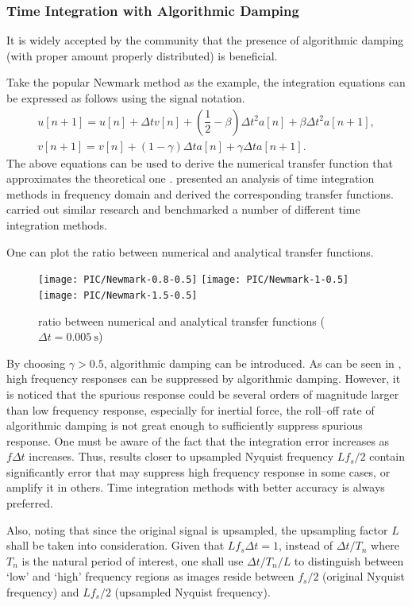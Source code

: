 \subsubsection{Time Integration with Algorithmic Damping}
It is widely accepted by the community that the presence of algorithmic damping (with proper amount properly distributed) is beneficial.

Take the popular Newmark method as the example, the integration equations can be expressed as follows using the signal notation.
\begin{gather}
u[n+1]=u[n]+\Delta{}tv[n]+\left(\dfrac{1}{2}-\beta\right)\Delta{}t^2a[n]+\beta\Delta{}t^2a[n+1],\\
v[n+1]=v[n]+\left(1-\gamma\right)\Delta{}ta[n]+\gamma\Delta{}ta[n+1].
\end{gather}
The above equations can be used to derive the numerical transfer function that approximates the theoretical one . \citet{Preumont1982} presented an analysis of time integration methods in frequency domain and derived the corresponding transfer functions. \citet{AriasTrujillo2012} carried out similar research and benchmarked a number of different time integration methods.

One can plot the ratio between numerical and analytical transfer functions.
\begin{figure}[htb!]
\centering
\texttt{[image: PIC/Newmark-0.8-0.5]}
\texttt{[image: PIC/Newmark-1-0.5]}
\texttt{[image: PIC/Newmark-1.5-0.5]}
\caption{ratio between numerical and analytical transfer functions ($\Delta{}t=\SI{0.005}{\second}$)}\label{fig:newmark_alg_damping}
\end{figure}
By choosing $\gamma>\num{0.5}$, algorithmic damping can be introduced. As can be seen in , high frequency responses can be suppressed by algorithmic damping. However, it is noticed that the spurious response could be several orders of magnitude larger than low frequency response, especially for inertial force, the roll--off rate of algorithmic damping is not great enough to sufficiently suppress spurious response. One must be aware of the fact that the integration error increases as $f\Delta{}t$ increases. Thus, results closer to upsampled Nyquist frequency $Lf_s/2$ contain significantly error that may suppress high frequency response in some cases, or amplify it in others. Time integration methods with better accuracy is always preferred.

Also, noting that since the original signal is upsampled, the upsampling factor $L$ shall be taken into consideration. Given that $Lf_s\Delta{}t=1$, instead of $\Delta{}t/T_n$ where $T_n$ is the natural period of interest, one shall use $\Delta{}t/T_n/L$ to distinguish between `low' and `high' frequency regions as images reside between $f_s/2$ (original Nyquist frequency) and $Lf_s/2$ (upsampled Nyquist frequency).

